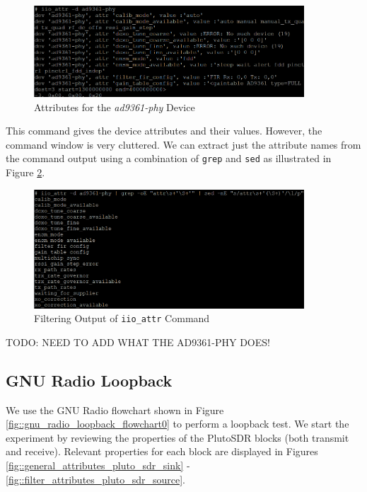 \documentclass{article}
\begin{document}
\begin{figure}[H]
	\centerline{\includegraphics[width=0.9\textwidth]{iio_raw_attributes.png}}
	\caption{Attributes for the \textit{ad9361-phy} Device}
	\label{fig::iio_raw_attributes}
\end{figure}

This command gives the device attributes and their values. However, the command window is very cluttered. We can extract just the attribute names from the command output using a combination of \texttt{grep} and \texttt{sed} as illustrated in Figure \ref{fig::iio_filtered_attributes}.

\begin{figure}[H]
	\centerline{\includegraphics[width=0.9\textwidth]{iio_filtered_attributes.png}}
	\caption{Filtering Output of \texttt{iio\_attr} Command}
	\label{fig::iio_filtered_attributes}
\end{figure}

TODO: NEED TO ADD WHAT THE AD9361-PHY DOES!


\subsection{GNU Radio Loopback}

We use the GNU Radio flowchart shown in Figure \ref{fig::gnu_radio_loopback_flowchart0} to perform a loopback test. We start the experiment by reviewing the properties of the PlutoSDR blocks (both transmit and receive). Relevant properties for each block are displayed in Figures \ref{fig::general_attributes_pluto_sdr_sink} - \ref{fig::filter_attributes_pluto_sdr_source}.
\end{document}
